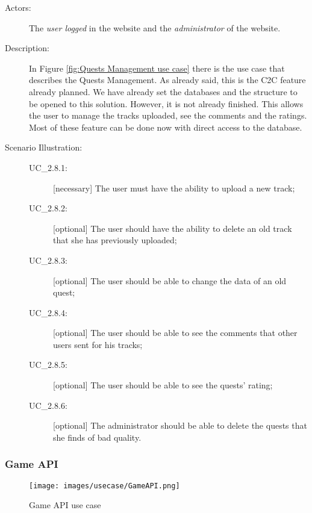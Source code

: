 \begin{description}
	\item[Actors:] The \textit{user logged} in the website and the \textit{administrator} of the website.
	\item[Description:] In Figure \ref{fig:Quests Management use case} there is the use case that describes the Quests Management. As already said, this is the C2C feature already planned. We have already set the databases and the structure to be opened to this solution. However, it is not already finished. This allows the user to manage the tracks uploaded, see the comments and the ratings. Most of these feature can be done now with direct access to the database.
	\item[Scenario Illustration:]
	
			\begin{description}
			\item[UC\_2.8.1:] [necessary] The user must have the ability to upload a new track;
			\item[UC\_2.8.2:] [optional] The user should have the ability to delete an old track that she has previously uploaded;
			\item[UC\_2.8.3:] [optional] The user should be able to change the data of an old quest;
			\item[UC\_2.8.4:] [optional] The user should be able to see the comments that other users sent for his tracks;
			\item[UC\_2.8.5:] [optional] The user should be able to see the quests' rating;
			\item[UC\_2.8.6:] [optional] The administrator should be able to delete the quests that she finds of bad quality.
		\end{description}
\end{description}

\subsubsection{Game API}
\label{sec:gameAPI}
\begin{figure}[H]
\centering %
\texttt{[image: images/usecase/GameAPI.png]}
\caption{Game API use case}
\label{fig:GameAPI}
\end{figure}

